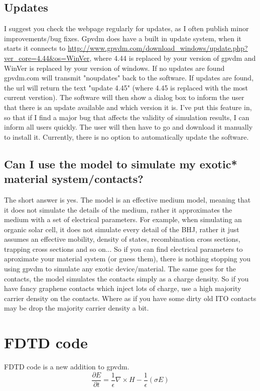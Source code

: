 \documentclass[11pt]{article}
\begin{document}
\subsection{Updates}
I suggest you check the webpage regularly for updates, as I often publish minor improvements/bug fixes.  Gpvdm does have a built in update system, when it starts it connects to  \url{http://www.gpvdm.com/download_windows/update.php?ver_core=4.44&os=WinVer}, where 4.44 is replaced by your version of gpvdm and WinVer is replaced by your version of windows.  If no updates are found gpvdm.com will transmit "noupdates" back to the software.  If updates are found, the url will return the text "update 4.45" (where 4.45 is replaced with the most current verstion).  The software will then show a dialog box to inform the user that there is an update available and which version it is.    I've put this feature in, so that if I find a major bug that affects the validity of simulation results, I can inform all users quickly.  The user will then have to go and download it manually to install it.  Currently, there is no option to automatically update the software. 

\subsection{Can I use the model to simulate my exotic* material system/contacts?}
The short answer is yes.  The model is an effective medium model, meaning that it does not simulate the details of the medium, rather it approximates the medium with a set of electrical parameters.  For example, when simulating an organic solar cell, it does not simulate every detail of the BHJ, rather it just assumes an effective mobility, density of states, recombination cross sections, trapping cross sections and so on...  So if you can find electrical parameters to aproximate your material system (or guess them), there is nothing stopping you using gpvdm to simulate any exotic device/material.  The same goes for the contacts, the model simulates the contacts simply as a charge density. So if you have fancy graphene contacts which inject lots of charge, use a high majority carrier density on the contacts.  Where as if you have some dirty old ITO contacts may be drop the majority carrier density a bit.

\newpage

\section{FDTD code}
FDTD code is a new addition to gpvdm.
\begin{equation}
\frac{\partial E}{\partial t}= \frac{1}{\epsilon} \nabla \times H - \frac{1}{\epsilon} (\sigma E) 
\end{equation}
\end{document}
